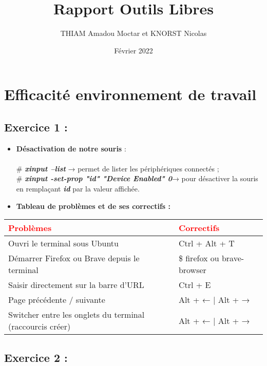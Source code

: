 \documentclass[a4paper]{article}
\title{Rapport Outils Libres}
\author{THIAM Amadou Moctar et KNORST Nicolas }
\date{Février 2022}
\begin{document}
\maketitle

\section{Efficacité environnement de travail}

\subsection{ Exercice 1 : }

\begin{itemize}
    \item \textbf{Désactivation de notre souris} : \\
    \\ \# \textit{\textbf{xinput --list}} → permet de lister les périphériques connectés ; \\
    \# \textit{\textbf{xinput -set-prop "id" "Device Enabled" 0}}→ pour désactiver la souris en remplaçant \textit{\textbf{id}} par la valeur affichée.\\
    
\item \textbf{Tableau de problèmes et de ses correctifs :} \\

\end{itemize} 
\begin{tabular}{|l|l|}
     \hline 
     \textcolor{red}{\textbf{Problèmes}} & \textcolor{red}{\textbf{Correctifs}}\\
     \hline
     Ouvri le terminal sous Ubuntu & Ctrl + Alt + T\\
     \hline
     Démarrer Firefox ou Brave depuis le terminal & \$ firefox ou brave-browser \\
     \hline
     Saisir directement sur la barre d'URL & Ctrl + E \\
     \hline
     Page précédente / suivante & Alt + ← | Alt + → \\
     \hline
     Switcher entre les onglets du terminal (raccourcis créer) & Alt + ← | Alt + → \\
     \hline
\end{tabular}

\subsection{Exercice 2 :}
\end{document}

